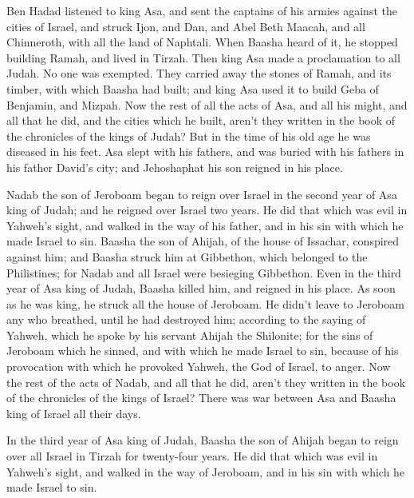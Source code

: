 {\par }{\PP {}Ben Hadad listened to king Asa, and sent the captains of his armies against the cities of Israel, and struck Ijon, and Dan, and Abel Beth Maacah, and all Chinneroth, with all the land of Naphtali.
When Baasha heard of it, he stopped building Ramah, and lived in Tirzah.
Then king Asa made a proclamation to all Judah. No one was exempted. They carried away the stones of Ramah, and its timber, with which Baasha had built; and king Asa used it to build Geba of Benjamin, and Mizpah.
Now the rest of all the acts of Asa, and all his might, and all that he did, and the cities which he built, aren’t they written in the book of the chronicles of the kings of Judah? But in the time of his old age he was diseased in his feet.
Asa slept with his fathers, and was buried with his fathers in his father David’s city; and Jehoshaphat his son reigned in his place.
\par }{\PP {}Nadab the son of Jeroboam began to reign over Israel in the second year of Asa king of Judah; and he reigned over Israel two years.
He did that which was evil in Yahweh’s sight, and walked in the way of his father, and in his sin with which he made Israel to sin.
Baasha the son of Ahijah, of the house of Issachar, conspired against him; and Baasha struck him at Gibbethon, which belonged to the Philistines; for Nadab and all Israel were besieging Gibbethon.
Even in the third year of Asa king of Judah, Baasha killed him, and reigned in his place.
As soon as he was king, he struck all the house of Jeroboam. He didn’t leave to Jeroboam any who breathed, until he had destroyed him; according to the saying of Yahweh, which he spoke by his servant Ahijah the Shilonite;
for the sins of Jeroboam which he sinned, and with which he made Israel to sin, because of his provocation with which he provoked Yahweh, the God of Israel, to anger.
Now the rest of the acts of Nadab, and all that he did, aren’t they written in the book of the chronicles of the kings of Israel?
There was war between Asa and Baasha king of Israel all their days.
\par }{\PP {}In the third year of Asa king of Judah, Baasha the son of Ahijah began to reign over all Israel in Tirzah for twenty-four years.
He did that which was evil in Yahweh’s sight, and walked in the way of Jeroboam, and in his sin with which he made Israel to sin.

}
